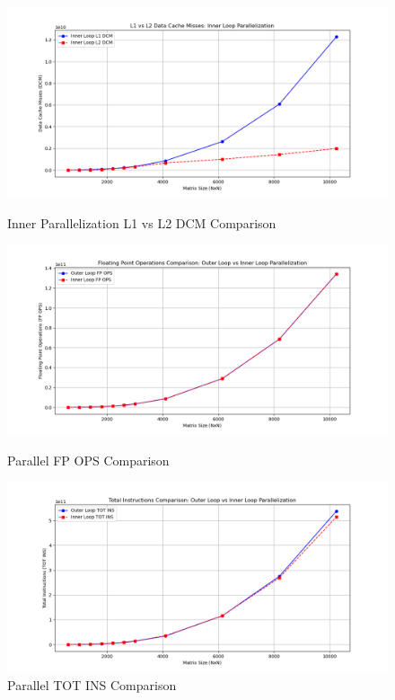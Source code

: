 \documentclass{article}
\begin{document}
\begin{figure}[H]
    \begin{minipage}{0.48\textwidth} %
        \centering
        \includegraphics[width=\textwidth]{Figure_9.png} %
        \caption{\small Inner Parallelization L1 vs L2 DCM Comparison}
        \label{fig:cache_misses_parallel2}
    \end{minipage}
    \hfill
    \begin{minipage}{0.48\textwidth} %
        \centering
        \includegraphics[width=\textwidth]{Figure_10.png} %
        \caption{\small Parallel FP OPS Comparison}
        \label{fig:fp_ops}
    \end{minipage}

    \begin{minipage}{0.48\textwidth} %
        \centering
        \includegraphics[width=\textwidth]{Figure_11.png} %
        \caption{\small Parallel TOT INS Comparison}
        \label{fig:tot_ins}
    \end{minipage}
\end{figure}
\end{document}
